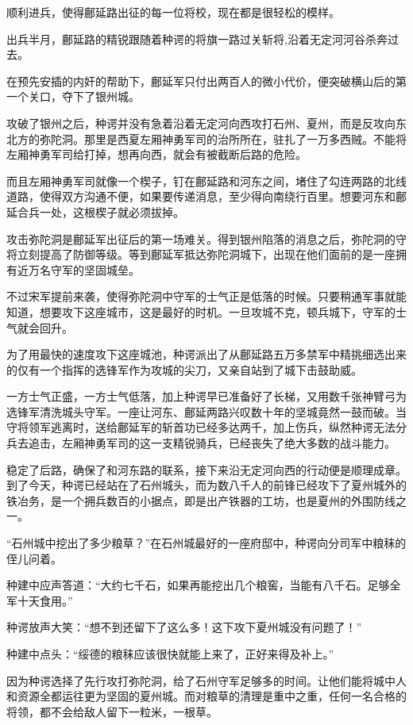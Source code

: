 顺利进兵，使得鄜延路出征的每一位将校，现在都是很轻松的模样。

出兵半月，鄜延路的精锐跟随着种谔的将旗一路过关斩将,沿着无定河河谷杀奔过去。

在预先安插的内奸的帮助下，鄜延军只付出两百人的微小代价，便突破横山后的第一个关口，夺下了银州城。

攻破了银州之后，种谔并没有急着沿着无定河向西攻打石州、夏州，而是反攻向东北方的弥陀洞。那里是西夏左厢神勇军司的治所所在，驻扎了一万多西贼。不能将左厢神勇军司给打掉，想再向西，就会有被截断后路的危险。

而且左厢神勇军司就像一个楔子，钉在鄜延路和河东之间，堵住了勾连两路的北线道路，使得双方沟通不便，如果要传递消息，至少得向南绕行百里。想要河东和鄜延合兵一处，这根楔子就必须拔掉。

攻击弥陀洞是鄜延军出征后的第一场难关。得到银州陷落的消息之后，弥陀洞的守将立刻提高了防御等级。等到鄜延军抵达弥陀洞城下，出现在他们面前的是一座拥有近万名守军的坚固城垒。

不过宋军提前来袭，使得弥陀洞中守军的士气正是低落的时候。只要稍通军事就能知道，想要攻下这座城市，这是最好的时机。一旦攻城不克，顿兵城下，守军的士气就会回升。

为了用最快的速度攻下这座城池，种谔派出了从鄜延路五万多禁军中精挑细选出来的仅有一个指挥的选锋军作为攻城的尖刀，又亲自站到了城下击鼓助威。

一方士气正盛，一方士气低落，加上种谔早已准备好了长梯，又用数千张神臂弓为选锋军清洗城头守军。一座让河东、鄜延两路兴叹数十年的坚城竟然一鼓而破。当守将领军逃离时，送给鄜延军的斩首功已经多达两千，加上伤兵，纵然种谔无法分兵去追击，左厢神勇军司的这一支精锐骑兵，已经丧失了绝大多数的战斗能力。

稳定了后路，确保了和河东路的联系，接下来沿无定河向西的行动便是顺理成章。到了今天，种谔已经站在了石州城头，而为数八千人的前锋已经攻下了夏州城外的铁冶务，是一个拥兵数百的小据点，即是出产铁器的工坊，也是夏州的外围防线之一。

“石州城中挖出了多少粮草？”在石州城最好的一座府邸中，种谔向分司军中粮秣的侄儿问着。

种建中应声答道：“大约七千石，如果再能挖出几个粮窖，当能有八千石。足够全军十天食用。”

种谔放声大笑：“想不到还留下了这么多！这下攻下夏州城没有问题了！”

种建中点头：“绥德的粮秣应该很快就能上来了，正好来得及补上。”

因为种谔选择了先行攻打弥陀洞，给了石州守军足够多的时间。让他们能将城中人和资源全都运往更为坚固的夏州城。而对粮草的清理是重中之重，任何一名合格的将领，都不会给敌人留下一粒米，一根草。

